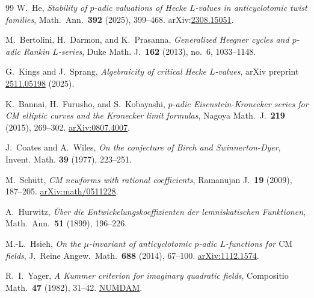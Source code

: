\documentclass[10pt]{article}
\theoremstyle{definition}
\begin{document}
\begin{thebibliography}{99}
W.~He,
\textit{Stability of $p$-adic valuations of {H}ecke $L$-values in anticyclotomic
twist families},
Math.\ Ann.\ \textbf{392} (2025), 399--468.
arXiv:\href{https://arxiv.org/abs/2308.15051}{2308.15051}.

M.~Bertolini, H.~Darmon, and K.~Prasanna,
\emph{Generalized Heegner cycles and $p$-adic Rankin $L$-series},
Duke Math. J.\ \textbf{162} (2013), no.\ 6, 1033--1148.

G.~Kings and J.~Sprang,
\emph{Algebraicity of critical Hecke $L$-values},
arXiv preprint \href{https://arxiv.org/abs/2511.05198}{2511.05198} (2025).

K.~Bannai, H.~Furusho, and S.~Kobayashi,
\emph{$p$-adic Eisenstein-Kronecker series for CM elliptic curves and the Kronecker limit formulas},
Nagoya Math.\ J.\ \textbf{219} (2015), 269--302.
\href{https://arxiv.org/abs/0807.4007}{arXiv:0807.4007}.

J.~Coates and A.~Wiles,
\emph{On the conjecture of {Birch} and {Swinnerton-Dyer}},
Invent. Math. \textbf{39} (1977), 223--251.

M.~Sch\"{u}tt,
\emph{CM newforms with rational coefficients},
Ramanujan J.\ \textbf{19} (2009), 187--205.
\href{https://arxiv.org/abs/math/0511228}{arXiv:math/0511228}.

A.~Hurwitz,
\emph{\"{U}ber die Entwickelungskoeffizienten der lemniskatischen Funktionen},
Math.\ Ann.\ \textbf{51} (1899), 196--226.

M.-L.~Hsieh,
\emph{On the $\mu$-invariant of anticyclotomic $p$-adic $L$-functions for $\mathrm{CM}$ fields},
J.\ Reine Angew.\ Math.\ \textbf{688} (2014), 67--100.
\href{https://arxiv.org/abs/1112.1574}{arXiv:1112.1574}.

R.~I.~Yager,
\emph{A Kummer criterion for imaginary quadratic fields},
Compositio Math.\ \textbf{47} (1982), 31--42.
\href{https://www.numdam.org/article/CM_1982__47_1_31_0.pdf}{NUMDAM}.


\end{thebibliography}
\end{document}

